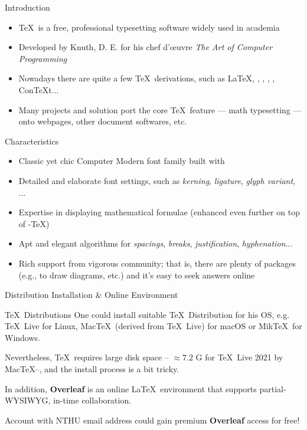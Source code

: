 \documentclass[mathserif]{beamer}
\begin{document}
\begin{frame}{Introduction}{}

\begin{itemize}
\item \TeX\ is a free, professional typesetting software widely used in academia
\item Developed by Knuth, D. E. for his chef d'\oe uvre \textit{The Art of Computer Programming}
\item Nowadays there are quite a few \TeX\ derivations, such as \textrm{\LaTeX}, \textrm{\XeTeX}, \textrm{\LuaTeX}, \textrm{\XeLaTeX}, \textrm{\LuaLaTeX}, \textrm{Con\TeX t}...
\item Many projects and solution port the core \TeX\ feature --- math typesetting --- onto webpages, other document softwares, etc.
\end{itemize}

\end{frame}

\begin{frame}{Characteristics}{}

\begin{itemize}
\item Classic yet chic \textrm{Computer Modern} font family built with \MF
\item Detailed and elaborate font settings, such as \textit{kerning}, \textit{ligature}, \textit{glyph variant}, ...
\item Expertise in displaying mathematical formulae (enhanced even further on top of \AmS-\TeX)
\item Apt and elegant algorithms for \textit{spacings}, \textit{breaks}, \textit{justification}, \textit{hyphenation}...
\item Rich support from vigorous community; that is, there are plenty of packages (e.g., to draw diagrams, etc.) and it's easy to seek answers online
\end{itemize}

\end{frame}

\begin{frame}{Distribution Installation \& Online Environment}{}

\begin{block}{\TeX\ Distributions}
One could install suitable \TeX\ Distribution for his OS, e.g. \TeX\ Live for Linux, Mac\TeX\ (derived from \TeX\ Live) for macOS or Mik\TeX\ for Windows.

Nevertheless, \TeX\ requires large disk space -- $\approx7.2$ G for \TeX\ Live 2021 by Mac\TeX--, and the install process is a bit tricky.
\end{block}

In addition, \textbf{Overleaf} is an online \LaTeX\ environment that supports partial-WYSIWYG, in-time collaboration.

Account with NTHU email address could gain premium \textbf{Overleaf} access for free!

\end{frame}
\end{document}
